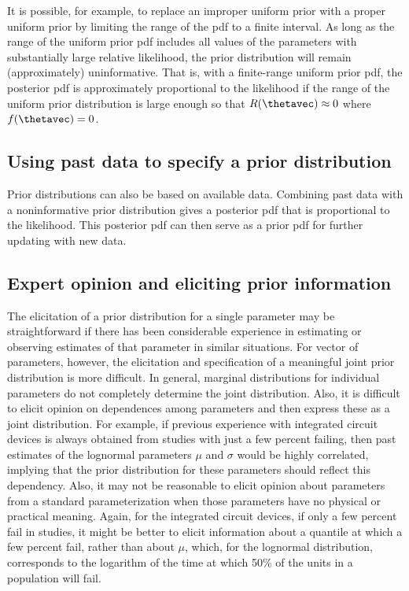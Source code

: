 It is possible, for example, to replace an improper uniform prior
with a proper uniform prior by limiting the range of the pdf to a
finite interval. As long as the range of the uniform prior pdf
includes all values of the parameters with substantially large
relative likelihood, the prior distribution will remain
(approximately) uninformative. That is, with a finite-range uniform
prior pdf, the posterior pdf is approximately proportional to the
likelihood if the range of the uniform prior distribution is large
enough so that $R(\thetavec) \approx 0$ where $f(\thetavec)=0$.


\subsection{Using past data to specify a prior distribution}
Prior distributions can also be based on available data.  Combining
past data with a noninformative prior distribution gives a posterior
pdf that is proportional to the likelihood. This posterior
pdf can then serve as a prior pdf for further updating with new
data.

\subsection{Expert opinion and eliciting prior information}

The elicitation of a prior distribution for a single parameter may be
straightforward if there has been considerable experience in estimating or
observing estimates of that parameter in similar situations.  For
vector of parameters, however, the elicitation and specification of a
meaningful joint prior distribution is more difficult.  In general,
marginal distributions for individual parameters do not completely
determine the joint distribution.  Also, it is difficult to
elicit opinion on dependences among parameters and then
express these as a joint distribution.  For example, if previous
experience with integrated circuit devices is always obtained from
studies with just a few percent failing, then past estimates of the
lognormal parameters $\mu$ and $\sigma$ would be highly correlated,
implying that the prior distribution for these parameters should
reflect this dependency.  Also, it may not be reasonable to elicit
opinion about parameters from a standard parameterization when those
parameters have no physical or practical meaning. Again, for the
integrated circuit devices, if only a few percent fail in studies, it
might be better to elicit information about a quantile at which a few
percent fail, rather than about $\mu$, which, for the lognormal distribution,
corresponds to the logarithm of the time at
which 50\% of the units in a population will fail.

